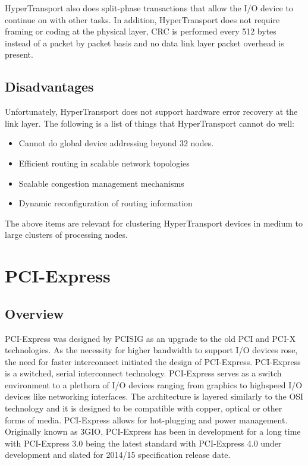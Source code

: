 \documentclass[conference]{IEEEtran}
\begin{document}
HyperTransport also does split-phase transactions that allow the I/O device to
continue on with other tasks. In addition, HyperTransport does not require framing or coding at the physical
layer, CRC is performed every 512 bytes instead of a packet by packet basis and
no data link layer packet overhead is present.

\subsection{Disadvantages}
\label{subsec:ht:disadv}
Unfortunately, HyperTransport does not support hardware error recovery at the
link layer. The following is a list of things that HyperTransport cannot do
well:

\begin{itemize}
  \item Cannot do global device addressing beyond 32 nodes.
  \item Efficient routing in scalable network topologies
  \item Scalable congestion management mechanisms
  \item Dynamic reconfiguration of routing information
\end{itemize}

The above items are relevant for clustering HyperTransport devices in medium to
large clusters of processing nodes\cite{duato2009extending}. 

\section{PCI-Express}
\subsection{Overview}
PCI-Express was designed by PCISIG as an upgrade to the old PCI and PCI-X
technologies. As the necessity for higher bandwidth to support I/O devices rose, the need for faster interconnect
initiated the design of PCI-Express. PCI-Express is a switched, serial
interconnect technology. PCI-Express serves as a switch environment to a
plethora of I/O devices ranging from graphics to highspeed I/O devices like
networking interfaces. The architecture is layered similarly to the OSI
technology and it is designed to be compatible with copper, optical or other
forms of media\cite{paulson2003ins}. PCI-Express allows for hot-plugging and
power management. Originally known as 3GIO, PCI-Express has been in development
for a long time with PCI-Express 3.0 being the latest standard with PCI-Express
4.0 under development and slated for 2014/15 specification release date. 
\end{document}
